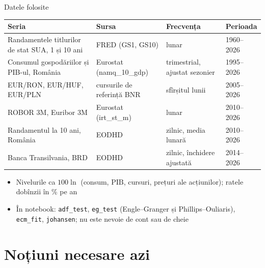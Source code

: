 \begin{frame}{Datele folosite}
\itemsize{\small}
\begin{center}
\footnotesize
\begin{tabular}{llll}
\toprule
\textbf{Seria} & \textbf{Sursa} & \textbf{Frecvența} & \textbf{Perioada} \\
\midrule
Randamentele titlurilor de stat SUA, 1 și 10 ani & FRED (GS1, GS10) & lunar & 1960--2026 \\
Consumul gospodăriilor și PIB-ul, România & Eurostat (namq\_10\_gdp) & trimestrial, ajustat sezonier & 1995--2026 \\
EUR/RON, EUR/HUF, EUR/PLN & cursurile de referință BNR & sfîrșitul lunii & 2005--2026 \\
ROBOR 3M, Euribor 3M & Eurostat (irt\_st\_m) & lunar & 2010--2026 \\
Randamentul la 10 ani, România & EODHD & zilnic, media lunară & 2010--2026 \\
Banca Transilvania, BRD & EODHD & zilnic, închidere ajustată & 2014--2026 \\
\bottomrule
\end{tabular}
\end{center}
\begin{itemize}
    \item Nivelurile ca $100\ln$ (consum, PIB, cursuri, prețuri ale acțiunilor); ratele dobînzii în \% pe an
    \item În notebook: \texttt{adf\_test}, \texttt{eg\_test} (Engle--Granger și Phillips--Ouliaris), \texttt{ecm\_fit}, \texttt{johansen}; nu este nevoie de cont sau de cheie
\end{itemize}
\end{frame}


\section{Noțiuni necesare azi}

